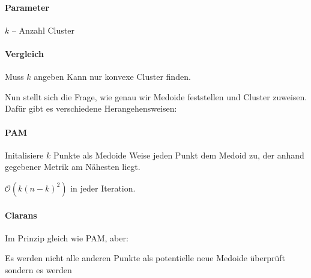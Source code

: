 \documentclass[10pt]{article} %
\begin{document}
\paragraph{Parameter}
\begin{cptitemize} 
  	 \item $k$ -- Anzahl Cluster 
 \end{cptitemize}  

 \paragraph{Vergleich}
 \begin{cptitemize} 
   \disadvantageit Muss $k$ angeben
   \disadvantageit Kann nur konvexe Cluster finden.
\end{cptitemize}  


\myhline

 Nun stellt sich die Frage, wie genau wir Medoide feststellen und Cluster zuweisen. Dafür gibt es verschiedene Herangehensweisen:

\paragraph{PAM}  

\begingroup
\removelatexerror
\begin{algorithm}[H]
   Initalisiere $k$ Punkte als Medoide \;
   Weise jeden Punkt dem Medoid zu, der anhand gegebener Metrik am Nähesten liegt. \;
\end{algorithm}
\endgroup

$\mathcal{O}(k(n-k)^2)$ in jeder Iteration.

\paragraph{Clarans}  

{Im Prinzip gleich wie PAM, aber:
\begin{cptitemize} 
     \item Es werden nicht alle anderen Punkte als potentielle neue Medoide überprüft sondern es werden 
\end{cptitemize} 
}
\end{document}

